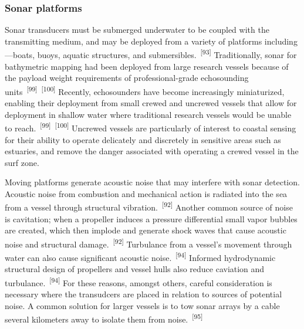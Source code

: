 \documentclass{article}
\begin{document}
\subsubsection{Sonar platforms}


\par{Sonar transducers must be submerged underwater to be coupled with the transmitting medium, and may be deployed from a variety of platforms including---boats, buoys, aquatic structures, and submersibles.~\textsuperscript{[93]} Traditionally, sonar for bathymetric mapping had been deployed from large research vessels because of the payload weight requirements of professional-grade echosounding units~\textsuperscript{[99]}~\textsuperscript{[100]} Recently, echosounders have become increasingly miniaturized, enabling their deployment from small crewed and uncrewed vessels that allow for deployment in shallow water where traditional research vessels would be unable to reach.~\textsuperscript{[99]}~\textsuperscript{[100]} Uncrewed vessels are particularly of interest to coastal sensing for their ability to operate delicately and discretely in sensitive areas such as estuaries, and remove the danger associated with operating a crewed vessel in the surf zone.}

\par{Moving platforms generate acoustic noise that may interfere with sonar detection. Acoustic noise from combustion and mechanical action is radiated into the sea from a vessel through structural vibration.~\textsuperscript{[92]} Another common source of noise is cavitation; when a propeller induces a pressure differential small vapor bubbles are created, which then implode and generate shock waves that cause acoustic noise and structural damage.~\textsuperscript{[92]} Turbulance from a vessel's movement through water can also cause significant acoustic noise.~\textsuperscript{[94]} Informed hydrodynamic structural design of propellers and vessel hulls also reduce caviation and turbulance.~\textsuperscript{[94]} For these reasons, amongst others, careful consideration is necessary where the transudcers are placed in relation to sources of potential noise. A common solution for larger vessels is to tow sonar arrays by a cable several kilometers away to isolate them from noise.~\textsuperscript{[95]}}

\end{document}
